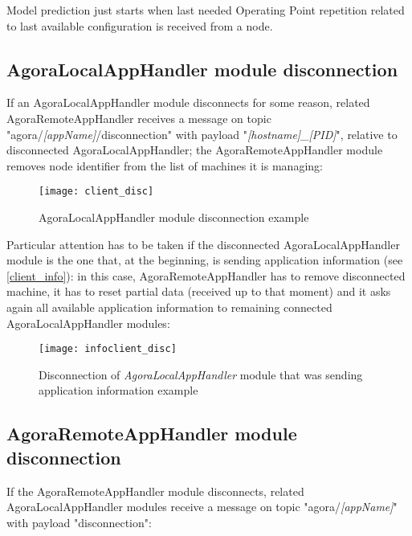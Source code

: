 Model prediction just starts when last needed Operating Point repetition related to last available configuration is received from a node.





\subsection{AgoraLocalAppHandler module disconnection}\label{client_disc}

If an AgoraLocalAppHandler module disconnects for some reason, related Agora\-Remote\-App\-Handler receives a message on topic "agora\slash{}\textit{[appName]}\slash{}disconnection" with payload "\textit{[hostname]\_[PID]}", relative to disconnected AgoraLocalAppHandler; the AgoraRemote\-App\-Handler module removes node identifier from the list of machines it is managing:

\begin{figure}[H]

    \centering
    \texttt{[image: client\_disc]}
    \caption{AgoraLocalAppHandler module disconnection example}
    
\end{figure}

Particular attention has to be taken if the disconnected AgoraLocalAppHandler module is the one that, at the beginning, is sending application information (see \ref{client_info}): in this case, AgoraRemoteAppHandler has to remove disconnected machine, it has to reset partial data (received up to that moment) and it asks again all available application information to remaining connected Agora\-Local\-App\-Handler modules:

\begin{figure}[H]

    \centering
    \texttt{[image: infoclient\_disc]}
    \caption{Disconnection of \textit{AgoraLocalAppHandler} module that was sending application information example}
    
\end{figure}





\subsection{AgoraRemoteAppHandler module disconnection}\label{handler_disc}

If the AgoraRemoteAppHandler module disconnects, related AgoraLocalAppHandler modules receive a message on topic "agora\slash{}\textit{[appName]}" with payload "disconnection":

